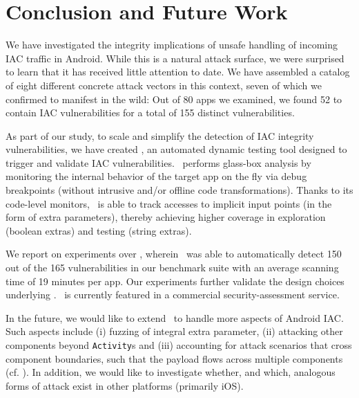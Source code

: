 \section{Conclusion and Future Work}\label{Se:conclusion}

We have investigated the integrity implications of unsafe handling of incoming IAC traffic in Android.
While this is a natural attack surface, we were surprised to learn that it has received little attention to date. We have assembled a catalog of eight different concrete attack vectors in this context, seven of which we confirmed to manifest in the wild: Out of 80 apps we examined, we found 52 to contain IAC vulnerabilities for a total of 155 distinct vulnerabilities.

As part of our study, to scale and simplify the detection of IAC integrity vulnerabilities, we have created \Tool, an automated dynamic testing tool designed to trigger and validate IAC vulnerabilities. \Tool\ performs glass-box analysis by monitoring the internal behavior of the target app on the fly via debug breakpoints (without intrusive and/or offline code transformations). Thanks to its code-level monitors, \Tool\ is able to track accesses to implicit input points (in the form of extra parameters), thereby achieving higher coverage in exploration (boolean extras) and testing (string extras). 

We report on experiments over \Tool, wherein \Tool\ was able to automatically detect 150 out of the 165 vulnerabilities in our benchmark suite with an average scanning time of 19 minutes per app. Our experiments further validate the design choices underlying \Tool. \Tool\ is currently featured in a commercial security-assessment service.

In the future, we would like to extend \Tool\ to handle more aspects of Android IAC. Such aspects include (i) fuzzing of integral extra parameter, (ii) attacking other components beyond {\tt Activity}s and (iii) accounting for attack scenarios that cross component boundaries, such that the payload flows across multiple components (cf. \cite{RALB:ARES14}). In addition, we would like to investigate whether, and which, analogous forms of attack exist in other platforms (primarily iOS).


